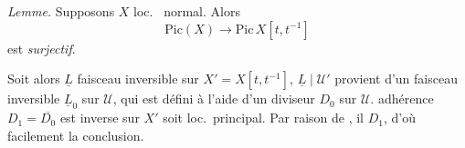 \documentclass[11pt,a4paper]{article}
\begin{document}
\emph{Lemme.} Supposons $X$  loc.\  normal. Alors \struck{\ill{}}
\[
  \mathrm{Pic}(X) \longrightarrow \mathrm{Pic}\, X[t, t^{-1}]
\]
est  \emph{surjectif}.

 Soit alors $\underline{L}$  faisceau inversible sur $X' = X[t, t^{-1}]$,    $\underline{L} \mid \mathcal{U}'$ \struck{\ill{}} provient d'un faisceau inversible $\underline{L}_0$ sur $\mathcal{U}$, qui est défini à l'aide d'un diviseur $D_0$ sur $\mathcal{U}$.  adhérence $D_1 = \overline{D_0}$ est     inverse sur $X'$ \struck{\ill{}} \struck{\ill{}} soit loc.\ principal. Par raison de , il      $D_1$, d'où facilement la conclusion.
\end{document}
